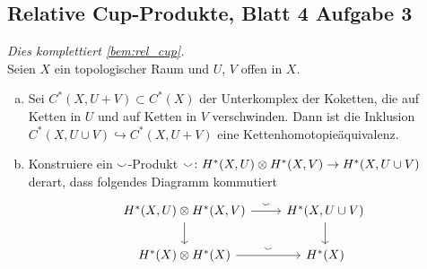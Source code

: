\subsection{Relative Cup-Produkte, Blatt 4 Aufgabe 3} %
\label{sub:relative_cup_produkte}
\emph{Dies komplettiert \autoref{bem:rel_cup}.}\smallskip\\
Seien $X$ ein topologischer Raum und $U$, $V$ offen in $X$.
\begin{enumerate}[(a)]
	\item Sei $C^*(X, U+V) \subset C^*(X)$ der Unterkomplex der Koketten, die auf Ketten in $U$ und auf Ketten in $V$ verschwinden. 
	Dann ist die Inklusion $C^*(X,U \cup V) \hookrightarrow C^*(X,U + V)$ eine Kettenhomotopieäquivalenz.
	\item Konstruiere ein $\smallsmile$-Produkt $\smallsmile \colon H^*(X,U) \otimes H^*(X,V) \to H^*(X, U\cup V)$ derart, dass folgendes Diagramm kommutiert
	\[
		\begin{tikzcd}
			H^*(X,U) \otimes H^*(X,V) \rar["\cupp"]\dar & H^*(X, U \cup V) \dar \\
			H^*(X) \otimes H^*(X) \rar["\cupp"] & H^*(X)
		\end{tikzcd}
	\]
\end{enumerate}
